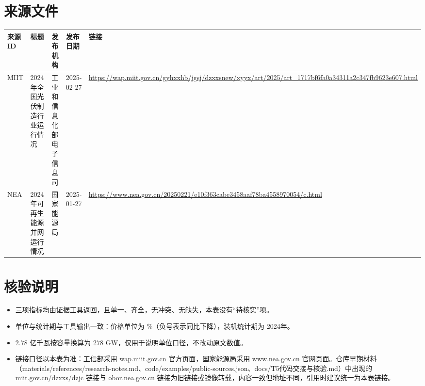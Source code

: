 \documentclass[UTF8,11pt]{ctexart}
\begin{document}
\section*{来源文件}

{\footnotesize
\setlength{\tabcolsep}{4pt}
\begin{tabularx}{\textwidth}{@{}p{1.4cm}p{4.8cm}p{3.2cm}p{1.8cm}Y@{}}
\toprule
来源ID & 标题 & 发布机构 & 发布日期 & 链接\\
\midrule
MIIT & 2024年全国光伏制造行业运行情况 & 工业和信息化部电子信息司 & 2025-02-27 &
\url{https://wap.miit.gov.cn/gyhxxhb/jgsj/dzxxsnew/xyyx/art/2025/art_1717bf6fa0a34311a2c347fb9623e607.html}\\
\addlinespace[2pt]
NEA & 2024年可再生能源并网运行情况 & 国家能源局 & 2025-01-27 &
\url{https://www.nea.gov.cn/20250221/e10f363cabe3458aaf78ba4558970054/c.html}\\
\bottomrule
\end{tabularx}
}

\section*{核验说明}

\begin{itemize}
  \setlength{\itemsep}{0.3em}
  \item 三项指标均由证据工具返回，且单一、齐全，无冲突、无缺失，本表没有“待核实”项。
  \item 单位与统计期与工具输出一致：价格单位为 \%（负号表示同比下降），装机统计期为 2024年。
  \item 2.78 亿千瓦按容量换算为 278 GW，仅用于说明单位口径，不改动原文数值。
  \item 链接口径以本表为准：工信部采用 wap.miit.gov.cn 官方页面，国家能源局采用 www.nea.gov.cn 官网页面。仓库早期材料（materials/references/research-notes.md、code/examples/public-sources.json、docs/T5代码交接与核验.md）中出现的 miit.gov.cn/dzxxs/dzjc 链接与 obor.nea.gov.cn 链接为旧链接或镜像转载，内容一致但地址不同，引用时建议统一为本表链接。
\end{itemize}
\end{document}
